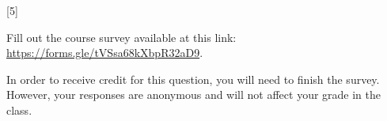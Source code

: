 \documentclass[12pt]{exam}
\newcommand{\checkbox}[3]{%
\iftoggle{pdfform}{%
\CheckBox[name = #1, backgroundcolor=white, bordercolor=black, #2]{}%
}{%
\ifprintanswers\else%
\framebox[0.6cm]{\rule{0pt}{0.4cm}#3}
\fi%
}%
}
\newcommand{\tf}[3]{\checkbox{#1}{}{#3} \quad #2}
\begin{document}
\begin{Form}
\begin{questions}


\newpage

[5]

Fill out the course survey available at this link: \url{https://forms.gle/tVSsa68kXbpR32aD9}.

In order to receive credit for this question, you will need to finish the survey.
However, your responses are anonymous and will not affect your grade in the class.


\end{questions}

\end{Form}
\end{document}
